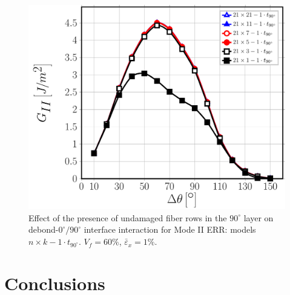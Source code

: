 \documentclass[Review,sagev,times]{sagej}
\begin{document}
\begin{figure}[!htb]
\centering
\includegraphics[height=0.375\textheight]{nxk-1-vf60-GII.pdf}
\caption{Effect of the presence of undamaged fiber rows in the $90^{\circ}$ layer on debond-$0^{\circ}/90^{\circ}$ interface interaction for Mode II ERR: models $n\times k-1\cdot t_{90^{\circ}}$. $V_{f}=60\%$, $\bar{\varepsilon}_{x}=1\%$.}\label{fig:nkGII}
\end{figure}


\section{Conclusions}
\end{document}
